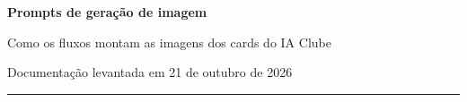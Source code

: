 \documentclass[11pt,a4paper]{article}
\begin{document}
\begin{center}
  {\fontsize{24}{29}\selectfont\bfseries Prompts de geração de imagem\par}
  \vspace{0.35em}
  {\color{muted} Como os fluxos montam as imagens dos cards do IA Clube\par}
  \vspace{0.45em}
  {\small\color{muted} Documentação levantada em 21 de outubro de 2026\par}
\end{center}
\vspace{0.8em}
\noindent\color{accent}\rule{\linewidth}{1.1pt}\color{ink}
\vspace{0.3em}
\tableofcontents
\vspace{0.8em}


\clearpage

\clearpage

\clearpage

\end{document}
